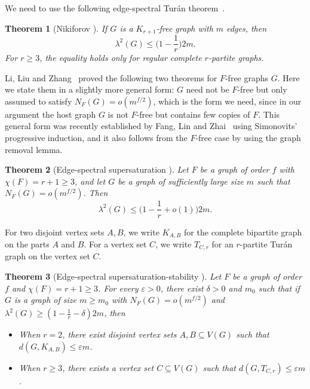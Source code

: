 \documentclass[11pt,a4paper]{article}
\newtheorem{theorem}{Theorem}[section]
\theoremstyle{definition}
\theoremstyle{plain}
\renewcommand{\leq}{\leqslant}
\renewcommand{\le}{\leqslant}
\renewcommand{\geq}{\geqslant}
\renewcommand{\ge}{\geqslant}
\begin{document}
We need to use the following edge-spectral Tur\'an theorem~\cite{Nikiforov}.

\begin{theorem}[Nikiforov \cite{Nikiforov}]\label{thm:nikiforov}
If $G$ is a $K_{r+1}$-free graph with $m$ edges, then
\[
  \lambda^2(G)\le {\Big(1-\frac1r\Big)2m}.
\]
For $r\ge 3$, the equality holds only for regular complete $r$-partite graphs.
\end{theorem}

Li, Liu and Zhang~\cite{LLZ-edge-spectral} 
 proved the following two theorems 
 for $F$-free graphs $G$.  
 Here we state them
in a slightly more general form: $G$ need not be $F$-free but 
only assumed to satisfy $N_F(G)=o(m^{f/2})$, which is the form we need, 
since in our argument the host 
graph $G$ is not $F$-free but contains few copies of $F$.  
This general form was recently established by Fang, Lin and Zhai~\cite{FLZ} using Simonovits' progressive induction,  
and it also follows from the $F$-free case  by using the graph removal lemma. 


\begin{theorem}[Edge-spectral supersaturation \cite{FLZ}] 
\label{thm:edge-spec-ESS}
Let $F$ be a graph of order $f$ with $\chi(F)=r+1\ge 3$, 
and let $G$ be a graph of sufficiently large size $m$ such that 
$N_F(G)=o(m^{f/2})$. Then 
$$ \lambda^2 (G)\le \Big(1-\frac{1}{r}+o(1) \Big)2m. $$ 
\end{theorem}


For two disjoint vertex sets $A,B$, 
we write $K_{A,B}$ for the complete bipartite graph on the parts $A$ and $B$. 
For a vertex set $C$, we write $T_{C,r}$ 
for an $r$-partite Tur\'{a}n graph on the vertex set $C$.  

\begin{theorem}[Edge-spectral supersaturation-stability \cite{FLZ}] 
\label{thm:edge-spectral-stability}
Let $F$ be a graph of order $f$ and $\chi (F)=r+1\ge 3$.
For every $\varepsilon >0$, there exist $\delta >0$ and $m_0$ such that if $G$ is a graph of size $m\ge m_0$ with $N_F(G)=o(m^{f/2})$ and $\lambda^2(G)\ge (1- \frac{1}{r} - \delta )2m$, then 
\begin{itemize}
\item[\rm (a)] When $r = 2$, there exist disjoint vertex sets $A, B \subseteq V(G)$ such that $d(G, K_{A, B}) \leq \varepsilon m$.

\item[\rm (b)]
 When $r \geq 3$, there exists a vertex set $C \subseteq V(G)$ such that $d(G, T_{C, r}) \leq \varepsilon m$. 
 \end{itemize} 
\end{theorem}
\end{document}
